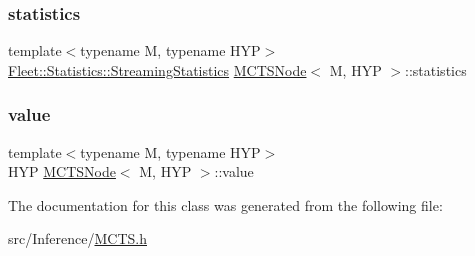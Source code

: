 \subsubsection{\texorpdfstring{statistics}{statistics}}
{\footnotesize\ttfamily template$<$typename M, typename H\+YP$>$ \\
\hyperlink{class_fleet_1_1_statistics_1_1_streaming_statistics}{Fleet\+::\+Statistics\+::\+Streaming\+Statistics} \hyperlink{class_m_c_t_s_node}{M\+C\+T\+S\+Node}$<$ M, H\+YP $>$\+::statistics}

\mbox{\label{class_m_c_t_s_node_a0442ab9a9378dabcd98ac7254b2e70a8}} 
\subsubsection{\texorpdfstring{value}{value}}
{\footnotesize\ttfamily template$<$typename M, typename H\+YP$>$ \\
H\+YP \hyperlink{class_m_c_t_s_node}{M\+C\+T\+S\+Node}$<$ M, H\+YP $>$\+::value}



The documentation for this class was generated from the following file\+:\begin{DoxyCompactItemize}
\item 
src/\+Inference/\hyperlink{_m_c_t_s_8h}{M\+C\+T\+S.\+h}\end{DoxyCompactItemize}
